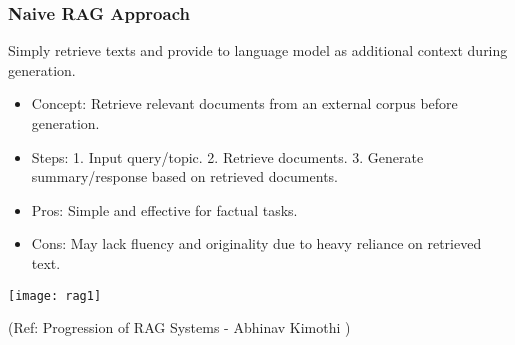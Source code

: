 









\begin{frame}[fragile]\frametitle{Naive RAG Approach}

Simply retrieve texts and provide to language model as additional context during generation.

\begin{itemize}
\item Concept: Retrieve relevant documents from an external corpus before generation.
\item Steps: 1. Input query/topic. 2. Retrieve documents. 3. Generate summary/response based on retrieved documents.
\item Pros: Simple and effective for factual tasks.
\item Cons: May lack fluency and originality due to heavy reliance on retrieved text.
\end{itemize}	

\begin{center}
\texttt{[image: rag1]}

{\tiny (Ref: Progression of RAG Systems - Abhinav Kimothi )}
\end{center}		

\end{frame}



